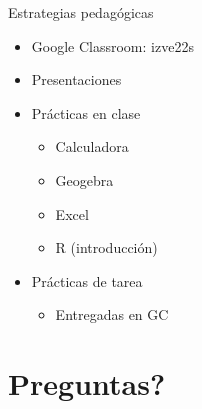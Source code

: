 \documentclass[
  11pt,
  ignorenonframetext,
]{beamer}
\providecommand{\tightlist}{%
  \setlength{\itemsep}{0pt}\setlength{\parskip}{0pt}}
\begin{document}
\begin{frame}{Estrategias pedagógicas}
\protect\hypertarget{estrategias-pedaguxf3gicas}{}
\begin{itemize}
\item
  Google Classroom: izve22s
\item
  Presentaciones
\item
  Prácticas en clase

  \begin{itemize}
  \tightlist
  \item
    Calculadora
  \item
    Geogebra
  \item
    Excel
  \item
    R (introducción)
  \end{itemize}
\item
  Prácticas de tarea

  \begin{itemize}
  \tightlist
  \item
    Entregadas en GC
  \end{itemize}
\end{itemize}
\end{frame}

\hypertarget{preguntas}{%
\section{Preguntas?}\label{preguntas}}
\end{document}
